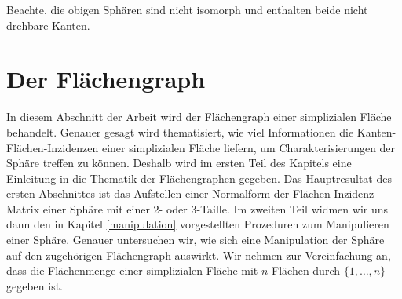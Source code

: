 \documentclass[12pt,titlepage,twoside,cleardoublepage]{article}
\theoremstyle{nummermitklammern}
\numberwithin{equation}{section}
\begin{document}
Beachte, die obigen Sphären sind nicht isomorph und enthalten beide nicht drehbare Kanten.
\newpage
\section{Der Flächengraph}
In diesem Abschnitt der Arbeit wird der Flächengraph einer simplizialen Fläche behandelt. Genauer gesagt wird thematisiert, wie viel Informationen die Kanten-Flächen-Inzidenzen einer simplizialen Fläche liefern, um Charakterisierungen der Sphäre treffen zu können. Deshalb wird im ersten Teil des Kapitels eine Einleitung in die Thematik der Flächengraphen gegeben. Das Hauptresultat des ersten Abschnittes ist das Aufstellen einer Normalform der Flächen-Inzidenz Matrix einer Sphäre mit einer 2- oder 3-Taille. Im zweiten Teil widmen wir uns dann den in Kapitel \ref{manipulation} vorgestellten Prozeduren zum Manipulieren einer Sphäre. Genauer untersuchen wir, wie sich eine Manipulation der Sphäre auf den zugehörigen Flächengraph auswirkt.  
Wir nehmen zur Vereinfachung an, dass die Flächenmenge einer simplizialen Fläche mit $n$ Flächen  durch $\{1,\ldots,n\}$ gegeben ist.
\end{document}
